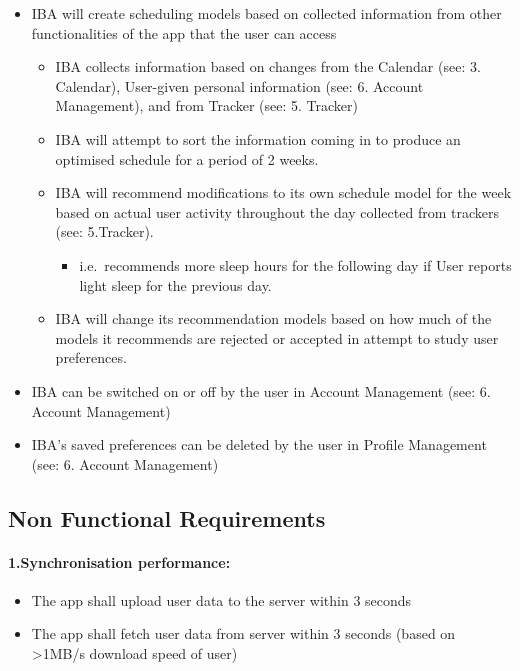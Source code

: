 \documentclass[a4paper,11pt]{article} %
\begin{document}
\begin{itemize}
\item
  IBA will create scheduling models based on collected information from
  other functionalities of the app that the user can access

  \begin{itemize}
  \item
    IBA collects information based on changes from the Calendar (see: 3.
    Calendar), User-given personal information (see: 6. Account
    Management), and from Tracker (see: 5. Tracker)
  \item
    IBA will attempt to sort the information coming in to produce an
    optimised schedule for a period of 2 weeks.
  \item
    IBA will recommend modifications to its own schedule model for the
    week based on actual user activity throughout the day collected from
    trackers (see: 5.Tracker).

    \begin{itemize}
    \item
      i.e.~recommends more sleep hours for the following day if User
      reports light sleep for the previous day.
    \end{itemize}
  \item
    IBA will change its recommendation models based on how much of the
    models it recommends are rejected or accepted in attempt to study
    user preferences.
  \end{itemize}
\item
  IBA can be switched on or off by the user in Account Management (see:
  6. Account Management)
\item
  IBA's saved preferences can be deleted by the user in Profile
  Management (see: 6. Account Management)
\end{itemize}
\newpage
\hypertarget{non-functional-requirements}{%
\subsection{Non Functional
Requirements}\label{non-functional-requirements}}

\hypertarget{sync-perf}{%
\paragraph{1.Synchronisation performance:}\label{to-add}}

\begin{itemize}
\item
  The app shall upload user data to the server within 3 seconds
\item
  The app shall fetch user data from server within 3 seconds (based on
  \textgreater1MB/s download speed of user)
\end{itemize}
\end{document}
